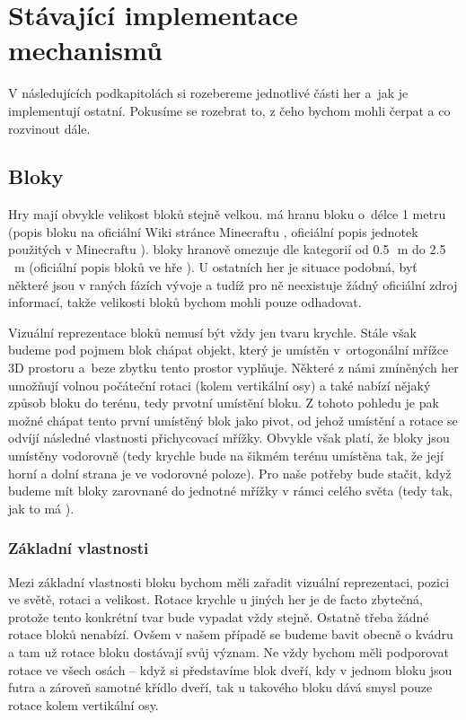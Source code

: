 

\section{Stávající implementace mechanismů}

V následujících podkapitolách si rozebereme jednotlivé části her a~jak je implementují ostatní. Pokusíme se rozebrat to, z čeho bychom mohli čerpat a co rozvinout dále.

\subsection{Bloky}

Hry mají obvykle velikost bloků stejně velkou. \MC{} má hranu bloku o~délce 1 metru (popis bloku na oficiální Wiki stránce Minecraftu \citep{mc_block}, oficiální popis jednotek použitých v Minecraftu \citep{mc_units}). \SE{} bloky hranově omezuje dle kategorií od 0.5\,\rm~m do 2.5\,\rm~m (oficiální popis bloků ve hře \citep{se_blocks_wiki}). U ostatních her je situace podobná, byť některé jsou v raných fázích vývoje a tudíž pro ně neexistuje žádný oficiální zdroj informací, takže velikosti bloků bychom mohli pouze odhadovat.

Vizuální reprezentace bloků nemusí být vždy jen tvaru krychle. Stále však budeme pod pojmem blok chápat objekt, který je umístěn v~ortogonální mřížce 3D prostoru a~beze zbytku tento prostor vyplňuje. Některé z námi zmíněných her umožňují volnou počáteční rotaci (kolem vertikální osy) a také nabízí nějaký způsob  bloku do terénu, tedy prvotní umístění bloku. Z tohoto pohledu je pak možné chápat tento první umístěný blok jako pivot, od jehož umístění a rotace se odvíjí následné vlastnosti přichycovací mřížky. Obvykle však platí, že bloky jsou umístěny vodorovně (tedy krychle bude na šikmém terénu umístěna tak, že její horní a dolní strana je ve vodorovné poloze). Pro naše potřeby bude stačit, když budeme mít bloky zarovnané do jednotné mřížky v rámci celého světa (tedy tak, jak to má \MC{}).

\subsubsection{Základní vlastnosti}

Mezi základní vlastnosti bloku bychom měli zařadit vizuální reprezentaci, pozici ve světě, rotaci a velikost. Rotace krychle u jiných her je de facto zbytečná, protože tento konkrétní tvar bude vypadat vždy stejně. Ostatně třeba \MC{} žádné rotace bloků nenabízí. Ovšem v našem případě se budeme bavit obecně o kvádru a tam už rotace bloku dostávají svůj význam. Ne vždy bychom měli podporovat rotace ve všech osách -- když si představíme blok dveří, kdy v jednom bloku jsou futra a zároveň samotné křídlo dveří, tak u takového bloku dává smysl pouze rotace kolem vertikální osy. 

